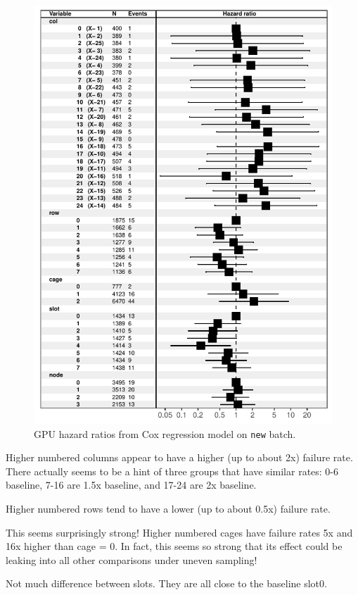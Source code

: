 \begin{figure}
  \includegraphics[width=5in]{figs/cox_n001.pdf}
  \caption{GPU hazard ratios from Cox regression model on {\tt new}
    batch.}
\end{figure}

Higher numbered columns appear to have a higher (up to about 2x)
failure rate. There actually seems to be a hint of three groups that
have similar rates: 0-6 baseline, 7-16 are 1.5x baseline, and 17-24
are 2x baseline. 

Higher numbered rows tend to have a lower (up to about 0.5x) failure rate.

This seems surprisingly strong! Higher numbered cages have failure
rates 5x and 16x higher than cage = 0. In fact, this seems so strong
that its effect could be leaking into all other comparisons under
uneven sampling!

Not much difference between slots. They are all close to the baseline
slot0.

